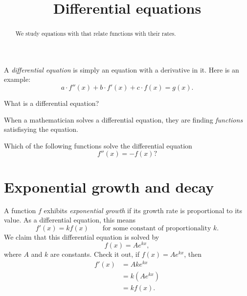 \documentclass{ximera}
\title[Dig-In:]{Differential equations}
\begin{document}
\begin{abstract}
  We study equations with that relate functions with their rates.
\end{abstract}
\maketitle

A \textit{differential equation} is
simply an equation with a derivative in it. Here is an example:
\[
a\cdot f''(x) + b\cdot f'(x) + c\cdot f(x) = g(x). 
\]
\begin{question}
  What is a differential equation?
  \begin{multipleChoice}
  \end{multipleChoice}
\end{question}

When a mathematician solves a differential equation, they are finding
\textit{functions} satisfisying the equation.
\begin{question}
  Which of the following functions solve the differential equation
  \[
  f''(x) = -f(x)?
  \]
  \begin{multipleResponse}
  \end{multipleResponse}
\end{question}




\section{Exponential growth and decay}

A function $f$ exhibits \textit{exponential growth} if its growth rate is proportional to its value. As a
differential equation, this means
\[
f'(x) = k f(x)\qquad\text{for some constant of proportionality $k$.}
\]
We claim that this differential equation is solved by
\[
f(x) = Ae^{kx},
\]
where $A$ and $k$ are constants.  Check it out, if $f(x) = Ae^{kx}$,
then
\begin{align*}
f'(x) &= Ak e^{kx}\\
&= k\left(Ae^{kx} \right)\\
&= k f(x).
\end{align*}
\end{document}
